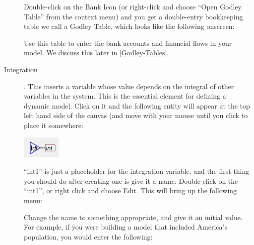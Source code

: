 \begin{description}
Double-click on the Bank Icon (or right-click and choose ``Open Godley
Table'' from the context menu) and you get a double-entry bookkeeping
table we call a Godley Table, which looks like the following onscreen:


\begin{center}
\par\end{center}

Use this table to enter the bank accounts and financial flows in your
model. We discuss this later in \ref{Godley-Tables}.
\item [{Integration}] .\label{Integrate} This inserts
a variable whose value depends on the integral of other variables
in the system. This is the essential element for defining a dynamic
model. Click on it and the following entity will appear at the top
left hand side of the canvas (and move with your mouse until you click
to place it somewhere:
\begin{center}
\includegraphics{images/NewItem39} 
\par\end{center}

``int1'' is just a placeholder for the integration variable, and
the first thing you should do after creating one is give it a name.
Double-click on the ``int1'', or right click and choose Edit. This
will bring up the following menu:
\begin{center}
\par\end{center}

Change the name to something appropriate, and give it an initial value.
For example, if you were building a model that included America's
population, you would enter the following:
\begin{center}
\par\end{center}


\end{description}
